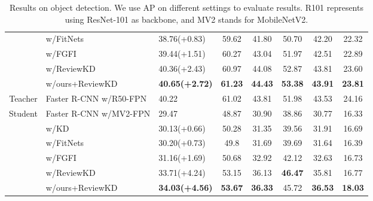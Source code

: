 \documentclass[letterpaper]{article} %
\begin{document}
\begin{table}[!h]
\begin{tabular}{@{}cl|lccccc@{}}
        & w/FitNets                 & 38.76(+0.83)          & 59.62          & 41.80          & 50.70          & 42.20          & 22.32          \\
        & w/FGFI                  & 39.44(+1.51)          & 60.27          & 43.04          & 51.97          & 42.51          & 22.89          \\
        & w/ReviewKD              & 40.36(+2.43)          & 60.97          & 44.08          & 52.87          & 43.81          & 23.60          \\
        & w/ours+ReviewKD                  & \textbf{40.65(+2.72)} & \textbf{61.23} & \textbf{44.43} & \textbf{53.38} & \textbf{43.91} & \textbf{23.81} \\ \hline
Teacher & Faster R-CNN w/R50-FPN  & 40.22          & 61.02          & 43.81          & 51.98          & 43.53          & 24.16          \\
Student & Faster R-CNN w/MV2-FPN  & 29.47          & 48.87          & 30.90          & 38.86          & 30.77          & 16.33          \\
        & w/KD                    & 30.13(+0.66)          & 50.28          & 31.35          & 39.56          & 31.91          & 16.69          \\
        & w/FitNets                 & 30.20(+0.73)          & 49.8           & 31.69          & 39.69          & 31.64          & 16.39          \\
        & w/FGFI                  & 31.16(+1.69)          & 50.68          & 32.92          & 42.12          & 32.63          & 16.73          \\
        & w/ReviewKD              & 33.71(+4.24)          & 53.15          & 36.13          & \textbf{46.47} & 35.81          & 16.77          \\
        & w/ours+ReviewKD                  & \textbf{34.03(+4.56)} & \textbf{53.67} & \textbf{36.33} & 45.72          & \textbf{36.53} & \textbf{18.03} 
\vspace{1pt}
\end{tabular}

\caption{Results on object detection. We use AP on different settings to evaluate results. R101 represents using ResNet-101 as backbone, and MV2 stands for MobileNetV2.}
\label{objection}
\end{table}
\end{document}
